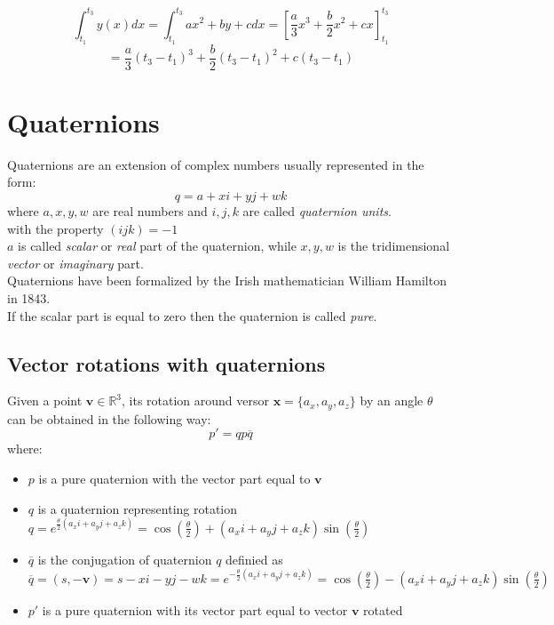 $$
\int_{t_1}^{t_3} y(x)dx = \int_{t_1}^{t_3} ax^2 + by + c dx = [\frac{a}{3}x^3+\frac{b}{2}x^2+c{x}]_{t_1}^{t_3} 
$$
$$= \frac{a}{3}(t_3-t_1)^3+\frac{b}{2}(t_3-t_1)^2+c(t_3-t_1)$$



\section{Quaternions}
Quaternions are an extension of complex numbers usually represented in the form:
$$ q = a + xi + yj + wk $$
where $a, x, y, w$ are real numbers and $i, j, k$ are called \textit{quaternion units}. \\
with the property ${(ijk)=-1}$  \\
$a$ is called \textit{scalar} or \textit{real} part of the quaternion, while $x,y,w$ is the tridimensional \textit{vector} or \textit{imaginary} part. \cite{amslaurea6701} \\
Quaternions have been formalized by the Irish mathematician William Hamilton in 1843. \\
If the scalar part is equal to zero then the quaternion is called \textit{pure}.

\subsection{Vector rotations with quaternions}
Given a point $\boldsymbol{v} \in \mathbb{R}^3$, its rotation around versor $\boldsymbol{x}=\{a_x, a_y, a_z\}$ by an angle $\theta$ can be obtained in the following way:
$$ p' = q p \overline{q}$$
where: \\
\begin{itemize}
\item $p$ is a pure quaternion with the vector part equal to $\boldsymbol{v}$
\item $q$ is a quaternion representing rotation $q=e^{\frac{\theta}{2}\left(a_x i + a_y j + a_z k\right)}=\cos\left(\frac{\theta}{2}\right)+(a_x i + a_y j + a_z k)\sin\left(\frac{\theta}{2}\right)$ 
\item $\overline{q}$ is the conjugation of quaternion $q$ definied as \\
$\overline{q}=(s,-\boldsymbol{v})=s-xi-yj-wk=e^{-\frac{\theta}{2}\left(a_x i + a_y j + a_z k\right)}=\cos \left(\frac{\theta}{2}\right)-(a_x i + a_y j + a_z k)\sin \left(\frac{\theta}{2}\right)$
\item $p'$ is a pure quaternion with its vector part equal to vector $\boldsymbol{v}$ rotated
\end{itemize}

